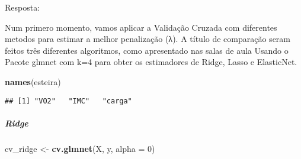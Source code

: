 \documentclass[]{article}
\newenvironment{Shaded}{\begin{snugshade}}{\end{snugshade}}
\newcommand{\DataTypeTok}[1]{\textcolor[rgb]{0.13,0.29,0.53}{#1}}
\newcommand{\DecValTok}[1]{\textcolor[rgb]{0.00,0.00,0.81}{#1}}
\newcommand{\FloatTok}[1]{\textcolor[rgb]{0.00,0.00,0.81}{#1}}
\newcommand{\KeywordTok}[1]{\textcolor[rgb]{0.13,0.29,0.53}{\textbf{#1}}}
\newcommand{\NormalTok}[1]{#1}
\newcommand{\OperatorTok}[1]{\textcolor[rgb]{0.81,0.36,0.00}{\textbf{#1}}}
\newcommand{\OtherTok}[1]{\textcolor[rgb]{0.56,0.35,0.01}{#1}}
\newcommand{\StringTok}[1]{\textcolor[rgb]{0.31,0.60,0.02}{#1}}
\let\oldsubparagraph\subparagraph
\renewcommand{\subparagraph}[1]{\oldsubparagraph{#1}\mbox{}}
\begin{document}
Resposta:

Num primero momento, vamos aplicar a Validação Cruzada com diferentes
metodos para estimar a melhor penalização (λ). A título de comparação
seram feitos três diferentes algoritmos, como apresentado nas salas de
aula Usando o Pacote glmnet com k=4 para obter os estimadores de Ridge,
Lasso e ElasticNet.

\begin{Shaded}
\begin{Highlighting}[]
\KeywordTok{names}\NormalTok{(esteira)}
\end{Highlighting}
\end{Shaded}

\begin{verbatim}
## [1] "VO2"   "IMC"   "carga"
\end{verbatim}

\begin{Shaded}
\end{Shaded}

\hypertarget{ridge}{%
\subparagraph{Ridge}\label{ridge}}

\begin{Shaded}
\begin{Highlighting}[]
\NormalTok{cv_ridge <-}\StringTok{ }\KeywordTok{cv.glmnet}\NormalTok{(X, y, }\DataTypeTok{alpha =} \DecValTok{0}\NormalTok{)}
\end{Highlighting}
\end{Shaded}
\end{document}

